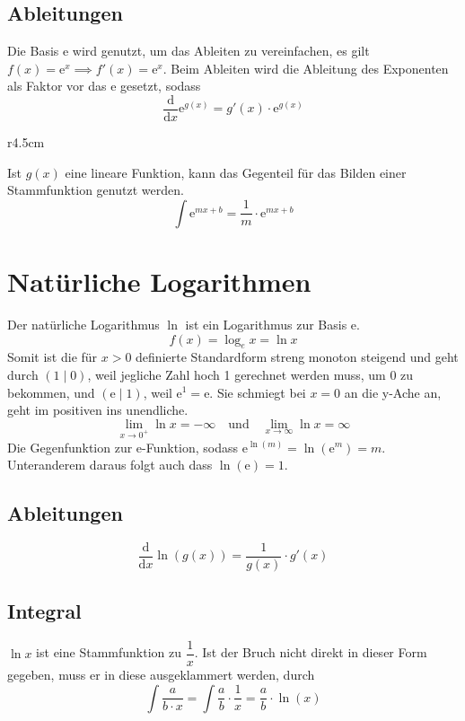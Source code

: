 \documentclass{article}
\begin{document}
\subsection{Ableitungen} 
Die Basis $\mathrm{e}$ wird genutzt, um das Ableiten zu vereinfachen, es gilt $f(x)=\mathrm{e}^x \implies f'(x)=\mathrm{e}^x$. \newline
Beim Ableiten wird die Ableitung des Exponenten als Faktor vor das $\mathrm{e}$ gesetzt, sodass 
\[
 \frac{\mathrm{d}}{\mathrm{d}x} \mathrm{e}^{g(x)} = g'(x) \cdot \mathrm{e}^{g(x)} 
\]  
\begin{wrapfigure}{r}{4.5cm}
 \centering
\end{wrapfigure} 
Ist $g(x)$ eine lineare Funktion, kann das Gegenteil für das Bilden einer Stammfunktion genutzt werden. 
\[
 \int \mathrm{e}^{mx+b} = \frac{1}{m} \cdot \mathrm{e}^{mx+b}
\] 
\section{Natürliche Logarithmen}  
Der natürliche Logarithmus $\ln$ ist ein Logarithmus zur Basis $\mathrm{e}$.
\[
 f(x) = \log_e{x} = \ln{x}
\] 
Somit ist die für $x>0$ definierte Standardform streng monoton steigend und geht durch ${(1 \mid 0)}$, weil jegliche Zahl hoch 1 gerechnet werden muss, um 0 zu bekommen, und $(\mathrm{e} \mid 1)$, weil $\mathrm{e}^1=\mathrm{e}$. \newline
Sie schmiegt bei $x=0$ an die y-Ache an, geht im positiven ins unendliche.
\[
 \lim_{x \to 0^+} \ln x = -\infty
 \quad \text{und} \quad
 \lim_{x \to \infty} \ln x= \infty
\] 
Die Gegenfunktion zur e-Funktion, sodass $\mathrm{e}^{\ln(m)}=\ln{(\mathrm{e}^m)}=m$. Unteranderem daraus folgt auch dass $\ln(\mathrm{e})=1$.
\subsection{Ableitungen} 
\[
 \frac{\mathrm{d}}{\mathrm{d}x} \ln{(g(x))} = \frac{1}{g(x)} \cdot g'(x) 
\] 
\subsection{Integral}
$\ln{x}$ ist eine Stammfunktion zu $\dfrac{1}{x}$. Ist der Bruch nicht direkt in dieser Form gegeben, muss er in diese ausgeklammert werden, durch
\[
 \int \frac{a}{b \cdot x} =
 \int \frac{a}{b} \cdot \frac{1}{x} =
 \frac{a}{b} \cdot \ln(x)
\] 
 
\end{document}
